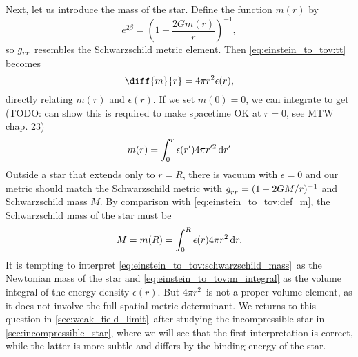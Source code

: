 Next, let us introduce the mass of the star.
Define the function $m(r)$ by
\begin{equation}
	e^{2 \beta} = \left( 1 - \frac{2 G m(r)}{r} \right)^{-1} ,
	\label{eq:einstein_to_tov:def_m}
\end{equation}
so $g\indices{_r_r}$ resembles the Schwarzschild metric element.
Then \cref{eq:einstein_to_tov:tt} becomes
\begin{equation}
	\diff{m}{r} = 4 \pi r^2 \epsilon(r) ,
	\label{eq:einstein_to_tov:m_rho}
\end{equation}
directly relating $m(r)$ and $\epsilon(r)$.
If we set $m(0) = 0$, we can integrate to get
(TODO: can show this is required to make spacetime OK at $r=0$, see MTW chap. 23)
\begin{equation}
	m(r) = \integral{\epsilon(r') 4 \pi r'^2}{r'}{0}{r}
	\label{eq:einstein_to_tov:m_integral}
\end{equation}
Outside a star that extends only to $r = R$, there is vacuum with $\epsilon = 0$ and our metric should match the Schwarzschild metric with $g\indices{_r_r} = (1-2GM/r)^{-1}$ and Schwarzschild mass $M$.
By comparison with \cref{eq:einstein_to_tov:def_m}, the Schwarzschild mass of the star must be
\begin{equation}
	M = m(R) = \integral{\epsilon(r) 4 \pi r^2}{r}{0}{R} .
	\label{eq:einstein_to_tov:schwarzschild_mass}
\end{equation}
It is tempting to interpret \eqref{eq:einstein_to_tov:schwarzschild_mass} as the Newtonian mass of the star and \eqref{eq:einstein_to_tov:m_integral} as the volume integral of the energy density $\epsilon(r)$.
But $4 \pi r^2$ is not a proper volume element, as it does not involve the full spatial metric determinant.
We returns to this question in \cref{sec:weak_field_limit} after studying the incompressible star in \cref{sec:incompressible_star}, where we will see that the first interpretation is correct, while the latter is more subtle and differs by the binding energy of the star.

